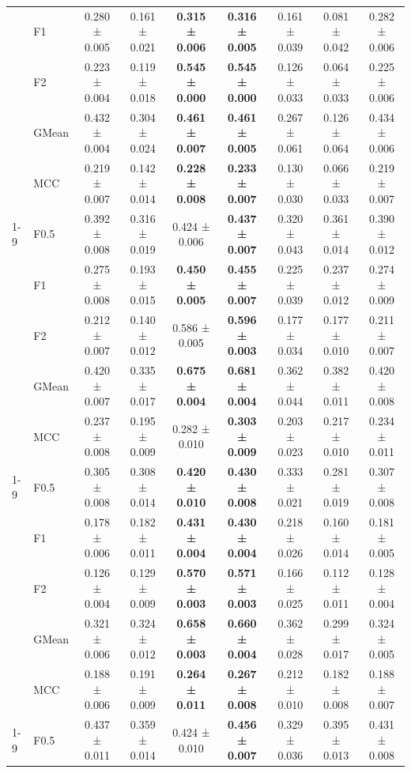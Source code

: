 \begin{table}[H]
{\begin{tabular}{llccccccc}
 & F1 & 0.280 ± 0.005 & 0.161 ± 0.021 & \textbf{0.315 ± 0.006} & \textbf{0.316 ± 0.005} & 0.161 ± 0.039 & 0.081 ± 0.042 & 0.282 ± 0.006 \\
 & F2 & 0.223 ± 0.004 & 0.119 ± 0.018 & \textbf{0.545 ± 0.000} & \textbf{0.545 ± 0.000} & 0.126 ± 0.033 & 0.064 ± 0.033 & 0.225 ± 0.006 \\
 & GMean & 0.432 ± 0.004 & 0.304 ± 0.024 & \textbf{0.461 ± 0.007} & \textbf{0.461 ± 0.005} & 0.267 ± 0.061 & 0.126 ± 0.064 & 0.434 ± 0.006 \\
 & MCC & 0.219 ± 0.007 & 0.142 ± 0.014 & \textbf{0.228 ± 0.008} & \textbf{0.233 ± 0.007} & 0.130 ± 0.030 & 0.066 ± 0.033 & 0.219 ± 0.007 \\
\cline{1-9}
\multirow[t]{5}{*}{LGBM()} & F0.5 & 0.392 ± 0.008 & 0.316 ± 0.019 & 0.424 ± 0.006 & \textbf{0.437 ± 0.007} & 0.320 ± 0.043 & 0.361 ± 0.014 & 0.390 ± 0.012 \\
 & F1 & 0.275 ± 0.008 & 0.193 ± 0.015 & \textbf{0.450 ± 0.005} & \textbf{0.455 ± 0.007} & 0.225 ± 0.039 & 0.237 ± 0.012 & 0.274 ± 0.009 \\
 & F2 & 0.212 ± 0.007 & 0.140 ± 0.012 & 0.586 ± 0.005 & \textbf{0.596 ± 0.003} & 0.177 ± 0.034 & 0.177 ± 0.010 & 0.211 ± 0.007 \\
 & GMean & 0.420 ± 0.007 & 0.335 ± 0.017 & \textbf{0.675 ± 0.004} & \textbf{0.681 ± 0.004} & 0.362 ± 0.044 & 0.382 ± 0.011 & 0.420 ± 0.008 \\
 & MCC & 0.237 ± 0.008 & 0.195 ± 0.009 & 0.282 ± 0.010 & \textbf{0.303 ± 0.009} & 0.203 ± 0.023 & 0.217 ± 0.010 & 0.234 ± 0.011 \\
\cline{1-9}
\multirow[t]{5}{*}{LogisticRegression()} & F0.5 & 0.305 ± 0.008 & 0.308 ± 0.014 & \textbf{0.420 ± 0.010} & \textbf{0.430 ± 0.008} & 0.333 ± 0.021 & 0.281 ± 0.019 & 0.307 ± 0.008 \\
 & F1 & 0.178 ± 0.006 & 0.182 ± 0.011 & \textbf{0.431 ± 0.004} & \textbf{0.430 ± 0.004} & 0.218 ± 0.026 & 0.160 ± 0.014 & 0.181 ± 0.005 \\
 & F2 & 0.126 ± 0.004 & 0.129 ± 0.009 & \textbf{0.570 ± 0.003} & \textbf{0.571 ± 0.003} & 0.166 ± 0.025 & 0.112 ± 0.011 & 0.128 ± 0.004 \\
 & GMean & 0.321 ± 0.006 & 0.324 ± 0.012 & \textbf{0.658 ± 0.003} & \textbf{0.660 ± 0.004} & 0.362 ± 0.028 & 0.299 ± 0.017 & 0.324 ± 0.005 \\
 & MCC & 0.188 ± 0.006 & 0.191 ± 0.009 & \textbf{0.264 ± 0.011} & \textbf{0.267 ± 0.008} & 0.212 ± 0.010 & 0.182 ± 0.008 & 0.188 ± 0.007 \\
\cline{1-9}
\multirow[t]{5}{*}{RandomForest} & F0.5 & 0.437 ± 0.011 & 0.359 ± 0.014 & 0.424 ± 0.010 & \textbf{0.456 ± 0.007} & 0.329 ± 0.036 & 0.395 ± 0.013 & 0.431 ± 0.008 \\

\end{tabular}}
\end{table}
